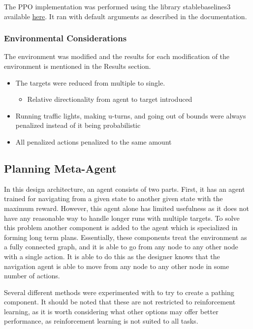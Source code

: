 \documentclass{article}
\begin{document}
The PPO implementation was performed using the library stable\textunderscore baselines3 available  \href{https://stable-baselines3.readthedocs.io/en/master/}{here}. It ran with default arguments as described in the documentation.

\subsubsection{Environmental Considerations}
\label{considerations}
The environment was modified and the results for each modification of the environment is mentioned in the Results section.
\begin{itemize}
	\item The targets were reduced from multiple to single. 
	\begin{itemize}
	\item Relative directionality from agent to target introduced
	\end{itemize}
	\item Running traffic lights, making u-turns, and going out of bounds were always penalized instead of it being probabilistic
	\item All penalized actions penalized to the same amount
\end{itemize}

\subsection{Planning Meta-Agent}
In this design architecture, an agent consists of two parts. First, it has an agent trained for navigating from a given state to another given state with the maximum reward. However, this agent alone has limited usefulness as it does not have any reasonable way to handle longer runs with multiple targets. To solve this problem another component is added to the agent which is specialized in forming long term plans. Essentially, these components treat the environment as a fully connected graph, and it is able to go from any node to any other node with a single action. It is able to do this as the designer knows that the navigation agent is able to move from any node to any other node in some number of actions.

Several different methods were experimented with to try to create a pathing component. It should be noted that these are not restricted to reinforcement learning, as it is worth considering what other options may offer better performance, as reinforcement learning is not suited to all tasks.
\end{document}
